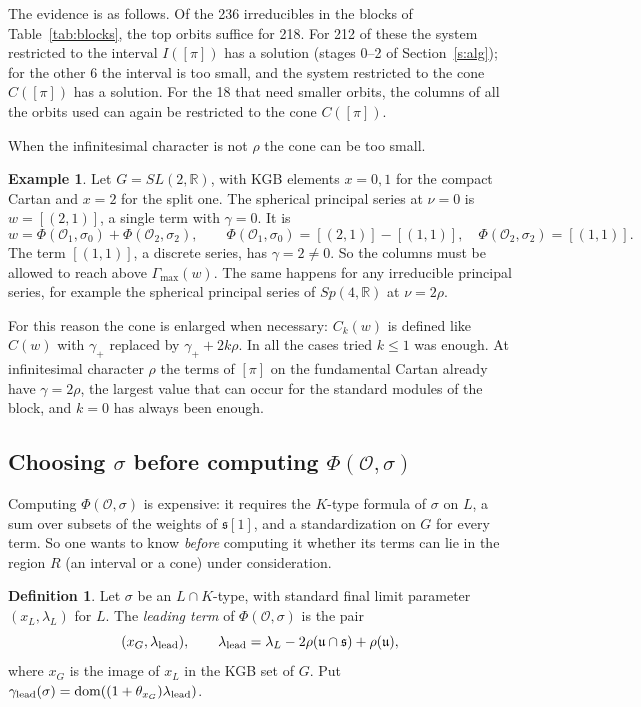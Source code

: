 \documentclass[11pt,leqno]{article}
\theoremstyle{definition}
\newtheorem{definition}[equation]{Definition}
\newtheorem{example}[equation]{Example}
\numberwithin{equation}{section}
\newcommand{\Ob}{\mathcal O}
\newcommand{\fs}{\mathfrak s}
\newcommand{\fu}{\mathfrak u}
\newcommand{\R}{\mathbb R}
\newcommand{\dom}{\mathrm{dom}}
\begin{document}
The evidence is as follows.  Of the 236 irreducibles in the blocks of
Table~\ref{tab:blocks}, the top orbits suffice for 218.  For 212 of these the
system restricted to the interval $I([\pi])$ has a solution (stages 0--2 of
Section~\ref{s:alg}); for the other 6 the interval is too small, and the
system restricted to the cone $C([\pi])$ has a solution.  For the 18 that need
smaller orbits, the columns of all the orbits used can again be restricted to
the cone $C([\pi])$.

When the infinitesimal character is not $\rho$ the cone can be too small.

\begin{example}
\label{e:sl2}
Let $G=SL(2,\R)$, with KGB elements $x=0,1$ for the compact Cartan and $x=2$
for the split one.  The spherical principal series at $\nu=0$ is
$w=[(2,1)]$, a single term with $\gamma=0$.  It is
\[
w=\Phi(\Ob_1,\sigma_0)+\Phi(\Ob_2,\sigma_2),\qquad
\Phi(\Ob_1,\sigma_0)=[(2,1)]-[(1,1)],\quad\Phi(\Ob_2,\sigma_2)=[(1,1)].
\]
The term $[(1,1)]$, a discrete series, has $\gamma=2\ne0$.  So the columns
must be allowed to reach above $\Gamma_{\max}(w)$.  The same happens for any
irreducible principal series, for example the spherical principal series of
$Sp(4,\R)$ at $\nu=2\rho$.
\end{example}

For this reason the cone is enlarged when necessary: $C_k(w)$ is defined like
$C(w)$ with $\gamma_+$ replaced by $\gamma_++2k\rho$.  In all the cases tried
$k\le 1$ was enough.  At infinitesimal character $\rho$ the terms of $[\pi]$
on the fundamental Cartan already have $\gamma=2\rho$, the largest value that
can occur for the standard modules of the block, and $k=0$ has always been
enough.

\subsection{Choosing $\sigma$ before computing $\Phi(\Ob,\sigma)$}
\label{s:bound}

Computing $\Phi(\Ob,\sigma)$ is expensive: it requires the $K$-type formula
of $\sigma$ on $L$, a sum over subsets of the weights of $\fs[1]$, and a
standardization on $G$ for every term.  So one wants to know \emph{before}
computing it whether its terms can lie in the region $R$ (an interval or a
cone) under consideration.

\begin{definition}
Let $\sigma$ be an $L\cap K$-type, with standard final limit parameter
$(x_L,\lambda_L)$ for $L$.  The \emph{leading term} of $\Phi(\Ob,\sigma)$ is
the pair
\[
(x_G,\lambda_{\rm lead}),\qquad
\lambda_{\rm lead}=\lambda_L-2\rho(\fu\cap\fs)+\rho(\fu),
\]
where $x_G$ is the image of $x_L$ in the KGB set of $G$.  Put
$\gamma_{\rm lead}(\sigma)=\dom((1+\theta_{x_G})\lambda_{\rm lead})$.
\end{definition}
\end{document}
